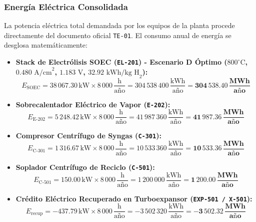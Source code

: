 \documentclass[10pt,letterpaper]{article}
\begin{document}
\subsubsection{Energía Eléctrica Consolidada}
La potencia eléctrica total demandada por los equipos de la planta procede directamente del documento oficial \texttt{TE-01}. El consumo anual de energía se desglosa matemáticamente:
\begin{itemize}
    \item \textbf{Stack de Electrólisis SOEC (\texttt{EL-201}) - Escenario D Óptimo ($800^\circ\text{C}$, $0.480\text{ A/cm}^2$, $1.183\text{ V}$, $32.92\text{ kWh/kg H}_2$):}
    \begin{equation}
    E_{\text{SOEC}} = 38\,067.30\,\text{kW} \times 8\,000\,\frac{\text{h}}{\text{año}} = 304\,538\,400\,\frac{\text{kWh}}{\text{año}} = \mathbf{304\,538.40\,\frac{\text{MWh}}{\text{año}}}
    \end{equation}
    \item \textbf{Sobrecalentador Eléctrico de Vapor (\texttt{E-202}):}
    \begin{equation}
    E_{\text{E-202}} = 5\,248.42\,\text{kW} \times 8\,000\,\frac{\text{h}}{\text{año}} = 41\,987\,360\,\frac{\text{kWh}}{\text{año}} = \mathbf{41\,987.36\,\frac{\text{MWh}}{\text{año}}}
    \end{equation}
    \item \textbf{Compresor Centrífugo de Syngas (\texttt{C-301}):}
    \begin{equation}
    E_{\text{C-301}} = 1\,316.67\,\text{kW} \times 8\,000\,\frac{\text{h}}{\text{año}} = 10\,533\,360\,\frac{\text{kWh}}{\text{año}} = \mathbf{10\,533.36\,\frac{\text{MWh}}{\text{año}}}
    \end{equation}
    \item \textbf{Soplador Centrífugo de Reciclo (\texttt{C-501}):}
    \begin{equation}
    E_{\text{C-501}} = 150.00\,\text{kW} \times 8\,000\,\frac{\text{h}}{\text{año}} = 1\,200\,000\,\frac{\text{kWh}}{\text{año}} = \mathbf{1\,200.00\,\frac{\text{MWh}}{\text{año}}}
    \end{equation}
    \item \textbf{Crédito Eléctrico Recuperado en Turboexpansor (\texttt{EXP-501 / X-501}):}
    \begin{equation}
    E_{\text{recup}} = -437.79\,\text{kW} \times 8\,000\,\frac{\text{h}}{\text{año}} = -3\,502\,320\,\frac{\text{kWh}}{\text{año}} = \mathbf{-3\,502.32\,\frac{\text{MWh}}{\text{año}}}
    \end{equation}

\end{itemize}
\end{document}
